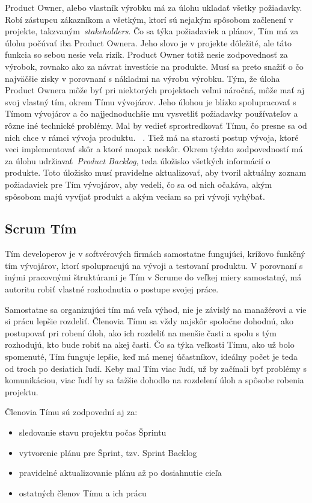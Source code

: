 \documentclass[10pt,slovak,a4paper]{article}
\begin{document}
Product Owner, alebo vlastník výrobku má za úlohu ukladať všetky požiadavky. Robí zástupcu zákazníkom a všetkým, ktorí sú nejakým spôsobom začlenení v projekte, takzvaným~\emph{stakeholders}. Čo sa týka požiadaviek a plánov, Tím má za úlohu počúvať iba Product Ownera. Jeho slovo je v projekte dôležité, ale táto funkcia so sebou nesie veľa rizík. Product Owner totiž nesie zodpovednosť za výrobok, rovnako ako za návrat investície na produkte. Musí sa preto snažiť o čo najväčšie zisky v porovnaní s nákladmi na výrobu výrobku. Tým, že úloha Product Ownera môže byť pri niektorých projektoch veľmi náročná, môže mať aj svoj vlastný tím, okrem Tímu vývojárov. Jeho úlohou je blízko spolupracovať s Tímom vývojárov a čo najjednoduchšie mu vysvetliť požiadavky používateľov a rôzne iné technické problémy. Mal by vedieť sprostredkovať Tímu, čo presne sa od nich chce v rámci vývoja produktu. ~\cite{techScrum}. Tiež má na starosti postup vývoja, ktoré veci implementovať skôr a ktoré naopak neskôr. Okrem týchto zodpovedností má za úlohu udržiavať~\emph{Product Backlog}, teda úložisko všetkých informácií o produkte. Toto úložisko musí pravidelne aktualizovať, aby tvoril aktuálny zoznam požiadaviek pre Tím vývojárov, aby vedeli, čo sa od nich očakáva, akým spôsobom majú vyvíjať produkt a akým veciam sa pri vývoji vyhýbať.~\cite{cprime}

\subsection{Scrum Tím} \label{funkcie:tim}

Tím developerov je v softvérových firmách samostatne fungujúci, krížovo funkčný tím vývojárov, ktorí spolupracujú na vývoji a testovaní produktu. V porovnaní s inými pracovnými štruktúrami je Tím v Scrume do veľkej miery samostatný, má autoritu robiť vlastné rozhodnutia o postupe svojej práce.~\cite{cprime} 

Samostatne sa organizujúci tím má veľa výhod, nie je závislý na manažérovi a vie si prácu lepšie rozdeliť. Členovia Tímu sa vždy najskôr spoločne dohodnú, ako postupovať pri robení úloh, ako ich rozdeliť na menšie časti a spolu s tým rozhodujú, kto bude robiť na akej časti. Čo sa týka veľkosti Tímu, ako už bolo spomenuté, Tím funguje lepšie, keď má menej účastníkov, ideálny počet je teda od troch po desiatich ľudí. Keby mal Tím viac ľudí, už by začínali byť problémy s komunikáciou, viac ľudí by sa ťažšie dohodlo na rozdelení úloh a spôsobe robenia projektu.~\cite{cprime}

Členovia Tímu sú zodpovední aj za:
\begin{itemize}
\item sledovanie stavu projektu počas Šprintu
\item vytvorenie plánu pre Šprint, tzv. Sprint Backlog
\item pravidelné aktualizovanie plánu až po dosiahnutie cieľa
\item ostatných členov Tímu a ich prácu~\cite{schwaber2020scrum}
\end{itemize}
\end{document}
